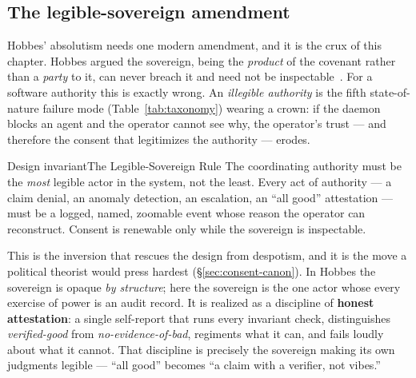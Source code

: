 \documentclass[11pt,a4paper]{article}
\theoremstyle{definition}
\theoremstyle{plain}
\begin{document}
\subsection{The legible-sovereign amendment}\label{sec:legible-sovereign}
Hobbes' absolutism needs one modern amendment, and it is the crux of this chapter.
Hobbes argued the sovereign, being the \emph{product} of the covenant rather than a
\emph{party} to it, can never breach it and need not be
inspectable~. For a software authority this is exactly
wrong. An \emph{illegible authority} is the fifth state-of-nature failure mode
(Table~\ref{tab:taxonomy}) wearing a crown: if the daemon blocks an agent and the
operator cannot see why, the operator's trust --- and therefore the consent that
legitimizes the authority --- erodes.
\begin{pdclaim}{Design invariant}{The Legible-Sovereign Rule}
\setlength{\parskip}{4pt plus 1pt}
\label{prop:legible-sovereign}
The coordinating authority must be the \emph{most} legible actor in the system, not
the least.
Every act of authority --- a claim denial, an anomaly detection, an
escalation, an ``all good'' attestation --- must be a logged, named, zoomable event
whose reason the operator can reconstruct.
Consent is renewable only while the
sovereign is inspectable.
\end{pdclaim}
This is the inversion that rescues the design from despotism, and it is the move a
political theorist would press hardest (\S\ref{sec:consent-canon}). In Hobbes the
sovereign is opaque \emph{by structure}; here the sovereign is the one actor whose
every exercise of power is an audit record. It is realized as a discipline of
\textbf{honest attestation}: a single self-report that runs every invariant check,
distinguishes \emph{verified-good} from \emph{no-evidence-of-bad}, regiments what it
can, and fails loudly about what it cannot. That discipline is precisely the
sovereign making its own judgments legible --- ``all good'' becomes ``a claim with a
verifier, not vibes.''
\end{document}
